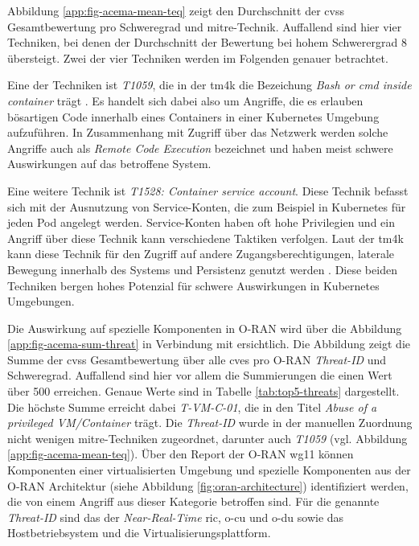 \par Abbildung \ref{app:fig-acema-mean-teq} zeigt den Durchschnitt der \gls{cvss} Gesamtbewertung pro Schweregrad und \gls{mitre}-Technik. Auffallend sind hier vier Techniken, bei denen der Durchschnitt der Bewertung bei hohem Schwerergrad 8 übersteigt. Zwei der vier Techniken werden im Folgenden genauer betrachtet.
\par Eine der Techniken ist \textit{T1059}, die in der \gls{tm4k} die Bezeichung \textit{Bash or cmd inside container} trägt \autocite{BashCmdContainer}. Es handelt sich dabei also um Angriffe, die es erlauben bösartigen Code innerhalb eines Containers in einer Kubernetes Umgebung aufzuführen. In Zusammenhang mit Zugriff über das Netzwerk werden solche Angriffe auch als \textit{Remote Code Execution} bezeichnet und haben meist schwere Auswirkungen auf das betroffene System.
\par Eine weitere Technik ist \textit{T1528: Container service account}. Diese Technik befasst sich mit der Ausnutzung von Service-Konten, die zum Beispiel in Kubernetes für jeden Pod angelegt werden. Service-Konten haben oft hohe Privilegien und ein Angriff über diese Technik kann verschiedene Taktiken verfolgen. Laut der \gls{tm4k} kann diese Technik für den Zugriff auf andere Zugangsberechtigungen, laterale Bewegung innerhalb des Systems und Persistenz genutzt werden \autocite{ContainerServiceAccount}.
Diese beiden Techniken bergen hohes Potenzial für schwere Auswirkungen in Kubernetes Umgebungen. 
\par Die Auswirkung auf spezielle Komponenten in O-RAN wird über die Abbildung \ref{app:fig-acema-sum-threat} in Verbindung mit \autocite{o-ranworkgroup11securityworkgroupORANSecurityThreat2024} ersichtlich. Die Abbildung zeigt die Summe der \gls{cvss} Gesamtbewertung über alle \glspl{cve} pro O-RAN \textit{Threat-ID} und Schweregrad. Auffallend sind hier vor allem die Summierungen die einen Wert über 500 erreichen. Genaue Werte sind in Tabelle \ref{tab:top5-threats} dargestellt. Die höchste Summe erreicht dabei \textit{T-VM-C-01}, die in \autocite{o-ranworkgroup11securityworkgroupORANSecurityThreat2024} den Titel \textit{Abuse of a privileged VM/Container} trägt. Die \textit{Threat-ID} wurde in der manuellen Zuordnung nicht wenigen \gls{mitre}-Techniken zugeordnet, darunter auch \textit{T1059} (vgl. Abbildung \ref{app:fig-acema-mean-teq}). Über den Report der O-RAN \gls{wg11} können Komponenten einer virtualisierten Umgebung und spezielle Komponenten aus der O-RAN Architektur (siehe Abbildung \ref{fig:oran-architecture}) identifiziert werden, die von einem Angriff aus dieser Kategorie betroffen sind. Für die genannte \textit{Threat-ID} sind das der \textit{Near-Real-Time} \gls{ric}, \gls{o-cu} und \gls{o-du} sowie das Hostbetriebsystem und die Virtualisierungsplattform.


